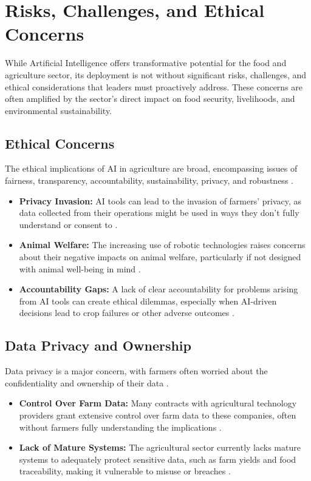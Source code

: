 \section{Risks, Challenges, and Ethical Concerns}

While Artificial Intelligence offers transformative potential for the food and agriculture sector, its deployment is not without significant risks, challenges, and ethical considerations that leaders must proactively address. These concerns are often amplified by the sector's direct impact on food security, livelihoods, and environmental sustainability.

\subsection{Ethical Concerns}
The ethical implications of AI in agriculture are broad, encompassing issues of fairness, transparency, accountability, sustainability, privacy, and robustness \cite{FrontiersIn_Ethical}.
\begin{itemize}
    \item \textbf{Privacy Invasion:} AI tools can lead to the invasion of farmers' privacy, as data collected from their operations might be used in ways they don't fully understand or consent to \cite{WJLTA_Ethical}.
    \item \textbf{Animal Welfare:} The increasing use of robotic technologies raises concerns about their negative impacts on animal welfare, particularly if not designed with animal well-being in mind \cite{NIH_Ethical}.
    \item \textbf{Accountability Gaps:} A lack of clear accountability for problems arising from AI tools can create ethical dilemmas, especially when AI-driven decisions lead to crop failures or other adverse outcomes \cite{Meegle_Ethical}.
\end{itemize}

\subsection{Data Privacy and Ownership}
Data privacy is a major concern, with farmers often worried about the confidentiality and ownership of their data \cite{HeyCoach_DataPrivacy}.
\begin{itemize}
    \item \textbf{Control Over Farm Data:} Many contracts with agricultural technology providers grant extensive control over farm data to these companies, often without farmers fully understanding the implications \cite{WJLTA_Ethical}.
    \item \textbf{Lack of Mature Systems:} The agricultural sector currently lacks mature systems to adequately protect sensitive data, such as farm yields and food traceability, making it vulnerable to misuse or breaches \cite{Keymakr_DataPrivacy}.
\end{itemize}

